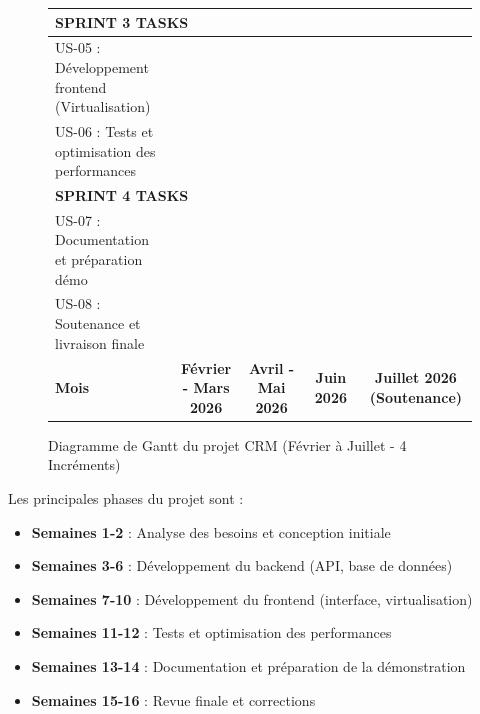 \begin{figure}[!htbp]
{\begin{tabular}{|p{7.5cm}|*{16}{c|}}
    \multicolumn{17}{|l|}{\cellcolor{gray!10}\textbf{SPRINT 3 TASKS}} \\
    \hline
    US-05 : Développement frontend (Virtualisation) & & & & & & & & & \cellcolor{orange!50} & \cellcolor{orange!50} & & & & & & \\
    \hline
    US-06 : Tests et optimisation des performances & & & & & & & & & & & \cellcolor{orange!50} & \cellcolor{orange!50} & & & & \\
    \hline
    
    \multicolumn{17}{|l|}{\cellcolor{gray!10}\textbf{SPRINT 4 TASKS}} \\
    \hline
    US-07 : Documentation et préparation démo & & & & & & & & & & & & & \cellcolor{green!50} & \cellcolor{green!50} & & \\
    \hline
    US-08 : Soutenance et livraison finale & & & & & & & & & & & & & & & \cellcolor{green!50} & \cellcolor{green!50} \\
    \hline
    
    \rowcolor{gray!20}
    \textbf{Mois} & \multicolumn{4}{c|}{\textbf{Février - Mars 2026}} & \multicolumn{4}{c|}{\textbf{Avril - Mai 2026}} & \multicolumn{4}{c|}{\textbf{Juin 2026}} & \multicolumn{4}{c|}{\textbf{Juillet 2026 (Soutenance)}} \\
    \hline
    \end{tabular}
    }
    \caption{Diagramme de Gantt du projet CRM (Février à Juillet - 4 Incréments)}
    \label{fig:gantt}
\end{figure}
\FloatBarrier

Les principales phases du projet sont :
\begin{itemize}
    \item \textbf{Semaines 1-2} : Analyse des besoins et conception initiale
    \item \textbf{Semaines 3-6} : Développement du backend (API, base de données)
    \item \textbf{Semaines 7-10} : Développement du frontend (interface, virtualisation)
    \item \textbf{Semaines 11-12} : Tests et optimisation des performances
    \item \textbf{Semaines 13-14} : Documentation et préparation de la démonstration
    \item \textbf{Semaines 15-16} : Revue finale et corrections
\end{itemize}


